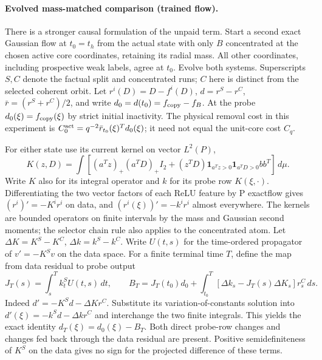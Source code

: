 \documentclass[11pt]{article}
\newcommand{\dd}{\,d}\newcommand{\E}{\mathbb E}
\begin{document}
\paragraph{Evolved mass-matched comparison (trained flow).}
There is a stronger causal formulation of the unpaid term. Start a
second exact Gaussian flow at $t_0=t_h$ from the actual state with
only $B$ concentrated at the chosen active core coordinates, retaining
its radial mass. All other coordinates, including prospective weak
labels, agree at $t_0$. Evolve both systems. Superscripts $S,C$ denote
the factual split and concentrated runs; $C$ here is distinct from
the selected coherent orbit. Let $r^i(D)=D-f^i(D)$, $d=r^S-r^C$,
$\bar r=(r^S+r^C)/2$, and write $d_0=d(t_0)=f_{\rm copy}-f_B$.
At the probe $d_0(\xi)=f_{\rm copy}(\xi)$ by strict initial inactivity.
The physical removal cost in this experiment is
$C_0^{\rm act}=q^{-2}\bar r_{t_0}(\xi)^T d_0(\xi)$; it need
not equal the unit-core cost $C_q$.

For either state use its current kernel on vector $L^2(P)$,
\[
 K(z,D)=\int\!\left[(a^Tz)_+(a^TD)_+ I_2+
 (z^TD)\mathbf1_{a^Tz>0}\mathbf1_{a^TD>0}bb^T\right]\dd\mu .
\]
Write $K$ also for its integral operator and $k$ for its probe row
$K(\xi,\cdot)$. Differentiating the two vector factors of each ReLU
feature by P exactflow gives $(r^i)'=-K^i r^i$ on data, and
$(r^i(\xi))'=-k^i r^i$ almost everywhere. The kernels are bounded
operators on finite intervals by the mass and Gaussian second
moments; the selector chain rule also applies to the concentrated
atom. Let $\Delta K=K^S-K^C$, $\Delta k=k^S-k^C$.
Write $U(t,s)$ for the time-ordered propagator of $v'=-K^S v$
on the data space. For a finite terminal time $T$, define the map
from data residual to probe output
\[
 J_T(s)=\int_s^T k^S_t U(t,s)\dd t,\qquad
 B_T=J_T(t_0)d_0+
 \int_{t_0}^T[\Delta k_s-J_T(s)\Delta K_s]r^C_s\dd s .
\]
Indeed $d'=-K^S d-\Delta K r^C$. Substitute its
variation-of-constants solution into
$d'(\xi)=-k^S d-\Delta k r^C$ and interchange the two finite
integrals. This yields the exact identity
$d_T(\xi)=d_0(\xi)-B_T$.
Both direct probe-row changes and changes fed back through the
data residual are present. Positive semidefiniteness of $K^S$ on
the data gives no sign for the projected difference of these terms.
\end{document}

